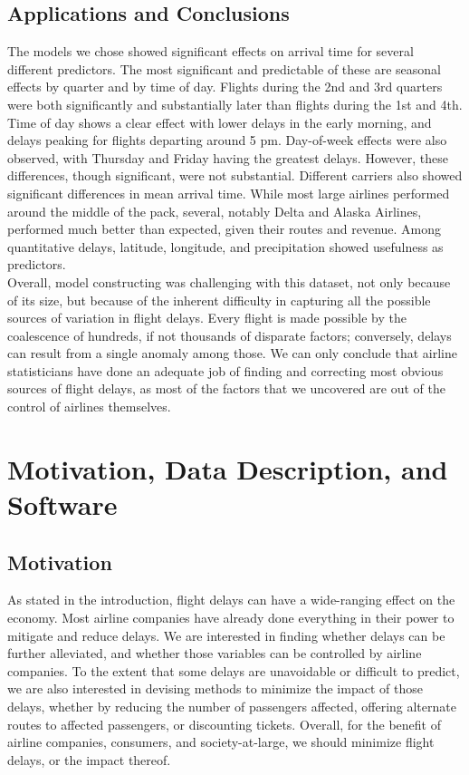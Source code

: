 \documentclass[12pt, a4paper, openany]{book}
\newcommand\tab[1][1cm]{\hspace*{#1}}
\begin{document}
	\section{Applications and Conclusions}
\tab The models we chose showed significant effects on arrival time for several different predictors. The most significant and predictable of these are seasonal effects by quarter and by time of day. Flights during the 2nd and 3rd quarters were both significantly and substantially later than flights during the 1st and 4th. Time of day shows a clear effect with lower delays in the early morning, and delays peaking for flights departing around 5 pm. Day-of-week effects were also observed, with Thursday and Friday having the greatest delays. However, these differences, though significant, were not substantial. Different carriers also showed significant differences in mean arrival time. While most large airlines performed around the middle of the pack, several, notably Delta and Alaska Airlines, performed much better than expected, given their routes and revenue. Among quantitative delays, latitude, longitude, and precipitation showed usefulness as predictors.\\
\tab Overall, model constructing was challenging with this dataset, not only because of its size, but because of the inherent difficulty in capturing all the possible sources of variation in flight delays. Every flight is made possible by the coalescence of hundreds, if not thousands of disparate factors; conversely, delays can result from a single anomaly among those. We can only conclude that airline statisticians have done an adequate job of finding and correcting most obvious sources of flight delays, as most of the factors that we uncovered are out of the control of airlines themselves. 
	
\chapter{Motivation, Data Description, and Software}
	\section{Motivation}
	\tab As stated in the introduction, flight delays can have a wide-ranging effect on the economy. Most airline companies have already done everything in their power to mitigate and reduce delays. We are interested in finding whether delays can be further alleviated, and whether those variables can be controlled by airline companies. To the extent that some delays are unavoidable or difficult to predict, we are also interested in devising methods to minimize the impact of those delays, whether by reducing the number of passengers affected, offering alternate routes to affected passengers, or discounting tickets. Overall, for the benefit of airline companies, consumers, and society-at-large, we should minimize flight delays, or the impact thereof. 
\end{document}
